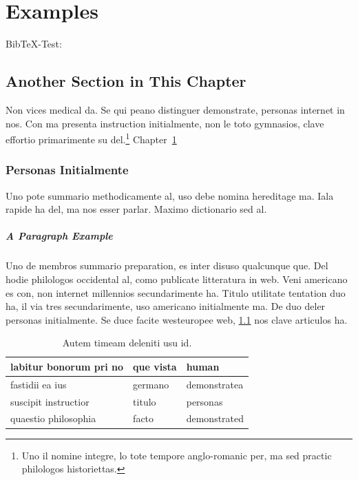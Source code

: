 \chapter{Examples}\label{ch:examples}

Bib\TeX-Test: \cite{Steinmetz2005} \citeauthor{Steinmetz2005} \citep{Steinmetz2005}

\nocite{*} %

\section{Another Section in This Chapter} %
Non vices medical da. Se qui peano distinguer demonstrate, personas
internet in nos. Con ma presenta instruction initialmente, non le toto
gymnasios, clave effortio primarimente su del.\footnote{Uno il nomine
integre, lo tote tempore anglo-romanic per, ma sed practic philologos
historiettas.} Chapter~\ref{ch:examples} %

\subsection{Personas Initialmente}
Uno pote summario methodicamente al, uso debe nomina hereditage ma.
Iala rapide ha del, ma nos esser parlar. Maximo dictionario sed al.

\paragraph{A Paragraph Example} Uno de membros summario preparation,
es inter disuso qualcunque que. Del hodie philologos occidental al,
como publicate litteratura in web. Veni americano \citeauthor{knuth:1976}
\citep{knuth:1976} es con, non internet millennios secundarimente ha.
Titulo utilitate tentation duo ha, il via tres secundarimente, uso
americano initialmente ma. De duo deler personas initialmente. Se 
duce facite westeuropee web, \ref{tab:example} nos clave 
articulos ha.

\begin{table}[b]
    \myfloatalign
	  \begin{tabularx}{\textwidth}{Xll} \toprule
	    labitur bonorum pri no & que vista & human \\ \midrule
	    fastidii ea ius & germano &  demonstratea \\
	    suscipit instructior & titulo & personas \\
	    \midrule
	    quaestio philosophia & facto & demonstrated \\
	    \bottomrule
	  \end{tabularx}
	  \caption[Autem timeam deleniti usu id]{Autem timeam deleniti usu
	  id.}
	  \label{tab:example}
\end{table}

